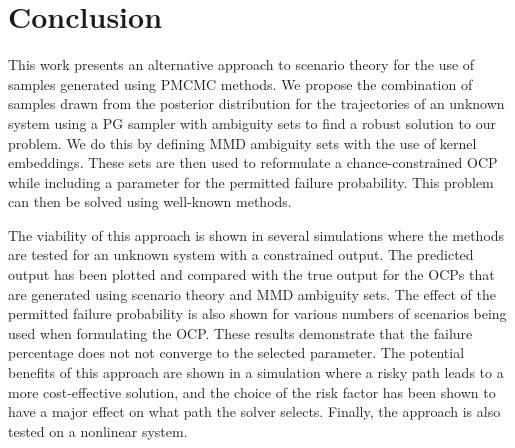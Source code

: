 \chapter{Conclusion} \label{Conclusion}

This work presents an alternative approach to scenario theory for the use of samples generated using PMCMC methods. We propose the combination of samples drawn from the posterior distribution for the trajectories of an unknown system using a PG sampler with ambiguity sets to find a robust solution to our problem. We do this by defining MMD ambiguity sets with the use of kernel embeddings. These sets are then used to reformulate a chance-constrained OCP while including a parameter for the permitted failure probability. This problem can then be solved using well-known methods.

The viability of this approach is shown in several simulations where the methods are tested for an unknown system with a constrained output. The predicted output has been plotted and compared with the true output for the OCPs that are generated using scenario theory and MMD ambiguity sets. The effect of the permitted failure probability is also shown for various numbers of scenarios being used when formulating the OCP. These results demonstrate that the failure percentage does not not converge to the selected parameter. The potential benefits of this approach are shown in a simulation where a risky path leads to a more cost-effective solution, and the choice of the risk factor has been shown to have a major effect on what path the solver selects. Finally, the approach is also tested on a nonlinear system.





